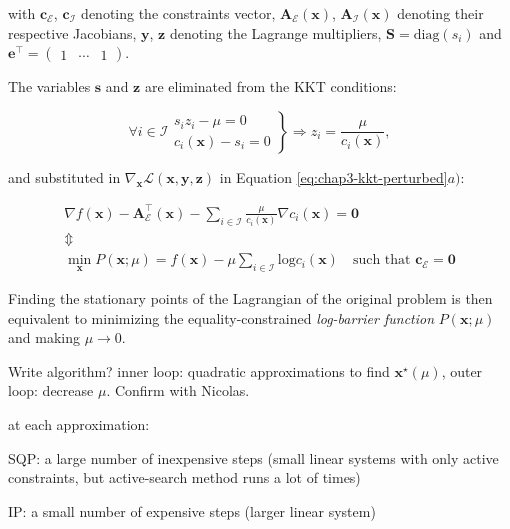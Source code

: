 with $\mathbf{c}_{\mathcal{E}}$, $\mathbf{c}_{\mathcal{I}}$ denoting
the constraints vector, $\mathbf{A}_\mathcal{E}(\mathbf{x})$,
$\mathbf{A}_\mathcal{I}(\mathbf{x})$ denoting their respective
Jacobians, $\mathbf{y}$, $\mathbf{z}$ denoting the Lagrange
multipliers, $\mathbf{S}=\text{diag}(s_i)$ and
$\mathbf{e}^\top=\left(\begin{matrix}1&\cdots&1\end{matrix}\right)$.

The variables $\mathbf{s}$ and $\mathbf{z}$ are eliminated from the
KKT conditions:

\begin{equation}
\forall i \in \mathcal{I}
\left.\begin{array}{r}
s_iz_i - \mu = 0\\
c_i(\mathbf{x})-s_i = 0
\end{array}\right\}
\Rightarrow
z_i=\frac{\mu}{c_i(\mathbf{x})},
\end{equation}

and substituted in
$\nabla_{\mathbf{x}}\mathcal{L}(\mathbf{x},\mathbf{y},\mathbf{z})$
in Equation \ref{eq:chap3-kkt-perturbed}$a)$:

\begin{equation}
\begin{array}{c}
\nabla f(\mathbf{x}) - \mathbf{A}_{\mathcal{E}}^{\top}(\mathbf{x}) -
\sum_{i\in\mathcal{I}}\frac{\mu}{c_i(\mathbf{x})}\nabla
c_i(\mathbf{x})=\mathbf{0} \\
\Updownarrow \\
\min_{\mathbf{x}}P(\mathbf{x};\mu)=f(\mathbf{x}) -
\mu\sum_{i\in\mathcal{I}}\text{log}c_i(\mathbf{x}) \quad\text{
  such that }\mathbf{c_{\mathcal{E}}=\mathbf{0}}
\end{array}
\end{equation}

Finding the stationary points of the Lagrangian of the original
problem is then equivalent to minimizing the equality-constrained
\emph{log-barrier function} $P(\mathbf{x};\mu)$ and making $\mu
\rightarrow 0$.

Write algorithm? inner loop: quadratic approximations to find
$\mathbf{x}^\star(\mu)$, outer loop: decrease $\mu$. Confirm with
Nicolas.

at each approximation:

SQP: a large number of inexpensive steps (small linear systems with
only active constraints, but active-search method runs a lot of times)

IP: a small number of expensive steps (larger
linear system)

